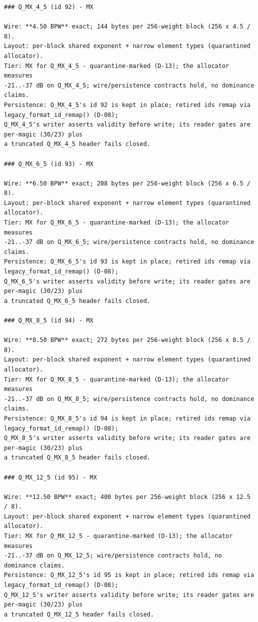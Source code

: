 \begin{Verbatim}[breaklines,breakanywhere,fontsize=\footnotesize]
### Q_MX_4_5 (id 92) - MX

Wire: **4.50 BPW** exact; 144 bytes per 256-weight block (256 x 4.5 / 8).
Layout: per-block shared exponent + narrow element types (quarantined allocator).
Tier: MX for Q_MX_4_5 - quarantine-marked (D-13); the allocator measures
-21..-37 dB on Q_MX_4_5; wire/persistence contracts hold, no dominance claims.
Persistence: Q_MX_4_5's id 92 is kept in place; retired ids remap via legacy_format_id_remap() (D-08);
Q_MX_4_5's writer asserts validity before write; its reader gates are per-magic (30/23) plus
a truncated Q_MX_4_5 header fails closed.

### Q_MX_6_5 (id 93) - MX

Wire: **6.50 BPW** exact; 208 bytes per 256-weight block (256 x 6.5 / 8).
Layout: per-block shared exponent + narrow element types (quarantined allocator).
Tier: MX for Q_MX_6_5 - quarantine-marked (D-13); the allocator measures
-21..-37 dB on Q_MX_6_5; wire/persistence contracts hold, no dominance claims.
Persistence: Q_MX_6_5's id 93 is kept in place; retired ids remap via legacy_format_id_remap() (D-08);
Q_MX_6_5's writer asserts validity before write; its reader gates are per-magic (30/23) plus
a truncated Q_MX_6_5 header fails closed.

### Q_MX_8_5 (id 94) - MX

Wire: **8.50 BPW** exact; 272 bytes per 256-weight block (256 x 8.5 / 8).
Layout: per-block shared exponent + narrow element types (quarantined allocator).
Tier: MX for Q_MX_8_5 - quarantine-marked (D-13); the allocator measures
-21..-37 dB on Q_MX_8_5; wire/persistence contracts hold, no dominance claims.
Persistence: Q_MX_8_5's id 94 is kept in place; retired ids remap via legacy_format_id_remap() (D-08);
Q_MX_8_5's writer asserts validity before write; its reader gates are per-magic (30/23) plus
a truncated Q_MX_8_5 header fails closed.

### Q_MX_12_5 (id 95) - MX

Wire: **12.50 BPW** exact; 400 bytes per 256-weight block (256 x 12.5 / 8).
Layout: per-block shared exponent + narrow element types (quarantined allocator).
Tier: MX for Q_MX_12_5 - quarantine-marked (D-13); the allocator measures
-21..-37 dB on Q_MX_12_5; wire/persistence contracts hold, no dominance claims.
Persistence: Q_MX_12_5's id 95 is kept in place; retired ids remap via legacy_format_id_remap() (D-08);
Q_MX_12_5's writer asserts validity before write; its reader gates are per-magic (30/23) plus
a truncated Q_MX_12_5 header fails closed.


\end{Verbatim}
